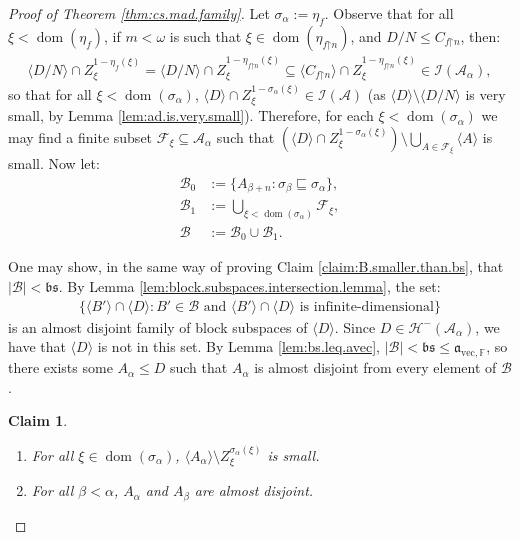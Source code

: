 \documentclass[10pt,a4paper]{amsart}
\theoremstyle{plain}
\numberwithin{equation}{section}
\newtheorem{claim}{Claim}
\theoremstyle{definition}
\newcommand{\func}{\operatorname}
\renewcommand{\c}[1]{\langle #1 \rangle}
\newcommand{\bb}[1]{\left( #1 \right)}
\newcommand{\F}{\cal{F}}
\newcommand{\cal}{\mathcal}
\renewcommand{\frak}{\mathfrak}
\newcommand{\dom}{\func{dom}}
\newcommand{\A}{\cal{A}}
\newcommand{\B}{\cal{B}}
\newcommand{\restrictedto}{\mathord{\upharpoonright}}
\renewcommand{\H}{\cal{H}}
\newcommand{\I}{\cal{I}}
\newcommand{\avec}{\frak{a}_{\mathrm{vec},\mathbb{F}}}
\begin{document}
\begin{proof}[Proof of Theorem \ref{thm:cs.mad.family}]
    Let $\sigma_{\alpha} := \eta_f$. Observe that for all $\xi < \dom(\eta_f)$, if $m < \omega$ is such that $\xi \in \dom(\eta_{f\restrictedto n})$, and $D/N \leq C_{f\restrictedto n}$, then:
    \begin{align*}
        \c{D/N} \cap Z_\xi^{1-\eta_f(\xi)} = \c{D/N} \cap Z_\xi^{1-\eta_{f\restrictedto n}(\xi)} \subseteq \c{C_{f\restrictedto n}} \cap Z_\xi^{1-\eta_{f\restrictedto n}(\xi)} \in \I(\A_\alpha),
    \end{align*}
    so that for all $\xi < \dom(\sigma_{\alpha})$, $\c{D} \cap Z_\xi^{1-\sigma_\alpha(\xi)} \in \I(\A)$ (as $\c{D} \setminus \c{D/N}$ is very small, by Lemma \ref{lem:ad.is.very.small}). Therefore, for each $\xi < \dom(\sigma_\alpha)$ we may find a finite subset $\F_\xi \subseteq \A_\alpha$ such that $\bb{\c{D} \cap Z_\xi^{1-\sigma_\alpha(\xi)}} \setminus \bigcup_{A \in \F_\xi} \c{A}$ is small. Now let:
    \begin{align*}
        \B_0 &:= \{A_{\beta+n} : \sigma_\beta \sqsubseteq \sigma_\alpha\}, \\
        \B_1 &:= \bigcup_{\xi < \dom(\sigma_\alpha)} \F_\xi, \\
        \B &:= \B_0 \cup \B_1.
    \end{align*}

    One may show, in the same way of proving Claim \ref{claim:B.smaller.than.bs}, that $|\B| < \frak{bs}$. By Lemma \ref{lem:block.subspaces.intersection.lemma}, the set:
    \begin{align*}
        \{\c{B'} \cap \c{D} : B' \in \B \text{ and } \c{B'} \cap \c{D} \text{ is infinite-dimensional}\}
    \end{align*}
    is an almost disjoint family of block subspaces of $\c{D}$. Since $D \in \H^-(\A_\alpha)$, we have that $\c{D}$ is not in this set. By Lemma \ref{lem:bs.leq.avec}, $|\B| < \frak{bs} \leq \avec$, so there exists some $A_\alpha \leq D$ such that $A_\alpha$ is almost disjoint from every element of $\B$. 

    \begin{claim}
        \hfill
        \begin{enumerate}
            \item For all $\xi \in \dom(\sigma_\alpha)$, $\c{A_\alpha} \setminus Z_\xi^{\sigma_\alpha(\xi)}$ is small.

            \item For all $\beta < \alpha$, $A_\alpha$ and $A_\beta$ are almost disjoint.
        \end{enumerate}
    \end{claim}


\end{proof}
\end{document}
